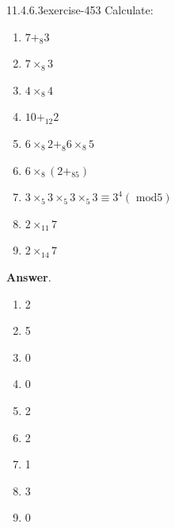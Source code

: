 \documentclass[twoside,10pt,]{book}
\numberwithin{equation}{section}
\begin{document}
\begin{divisionsolution}{11.4.6.3}{}{exercise-453}%
\hypertarget{p-4026}{}%
Calculate:\leavevmode%
\begin{multicols}{2}
\begin{enumerate}[label=(\alph*)]
\item\hypertarget{li-1819}{}\hypertarget{p-4027}{}%
\(7 +_8 3\)%
\item\hypertarget{li-1820}{}\hypertarget{p-4028}{}%
\(7 \times_8 3\)%
\item\hypertarget{li-1821}{}\hypertarget{p-4029}{}%
\(4\times_8 4\)%
\item\hypertarget{li-1822}{}\hypertarget{p-4030}{}%
\(10+_{12} 2\)%
\item\hypertarget{li-1823}{}\hypertarget{p-4031}{}%
\(6\times_8 2 +_8 6\times_8 5 \)%
\item\hypertarget{li-1824}{}\hypertarget{p-4032}{}%
\(6\times_8 \left(2 +_85\right)\)%
\item\hypertarget{li-1825}{}\hypertarget{p-4033}{}%
\(3 \times_5  3 \times_5  3 \times_5  3 \equiv  3^4 (\textrm{ mod} 5)\)%
\item\hypertarget{li-1826}{}\hypertarget{p-4034}{}%
\(2 \times_{11}7\)%
\item\hypertarget{li-1827}{}\hypertarget{p-4035}{}%
\(2 \times_{14}7\)%
\end{enumerate}
\end{multicols}
%
\par\smallskip%
\noindent\textbf{Answer}.\quad%
\hypertarget{p-4036}{}%
\leavevmode%
\begin{multicols}{4}
\begin{enumerate}[label=(\alph*)]
\item\hypertarget{li-1828}{}\hypertarget{p-4037}{}%
2%
\item\hypertarget{li-1829}{}\hypertarget{p-4038}{}%
5%
\item\hypertarget{li-1830}{}\hypertarget{p-4039}{}%
0%
\item\hypertarget{li-1831}{}\hypertarget{p-4040}{}%
0%
\item\hypertarget{li-1832}{}\hypertarget{p-4041}{}%
2%
\item\hypertarget{li-1833}{}\hypertarget{p-4042}{}%
2%
\item\hypertarget{li-1834}{}\hypertarget{p-4043}{}%
1%
\item\hypertarget{li-1835}{}\hypertarget{p-4044}{}%
3%
\item\hypertarget{li-1836}{}\hypertarget{p-4045}{}%
0%
\end{enumerate}
\end{multicols}
%
\end{divisionsolution}%
\end{document}

